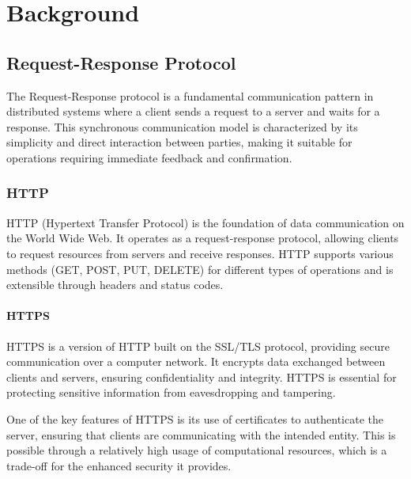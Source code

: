 \chapter{Background}
\section{Request-Response Protocol}
The Request-Response protocol is a fundamental communication pattern in distributed systems where a client sends a request to a server and waits for a response. This synchronous communication model is characterized by its simplicity and direct interaction between parties, making it suitable for operations requiring immediate feedback and confirmation.

\subsection{HTTP}
HTTP (Hypertext Transfer Protocol) is the foundation of data communication on the World Wide Web. It operates as a request-response protocol, allowing clients to request resources from servers and receive responses. HTTP supports various methods (GET, POST, PUT, DELETE) for different types of operations and is extensible through headers and status codes.

\subsubsection{HTTPS}
HTTPS is a version of HTTP built on the SSL/TLS protocol, providing secure communication over a computer network. It encrypts data exchanged between clients and servers, ensuring confidentiality and integrity. HTTPS is essential for protecting sensitive information from eavesdropping and tampering.

One of the key features of HTTPS is its use of certificates to authenticate the server, ensuring that clients are communicating with the intended entity. This is possible through a relatively high usage of computational resources, which is a trade-off for the enhanced security it provides.

